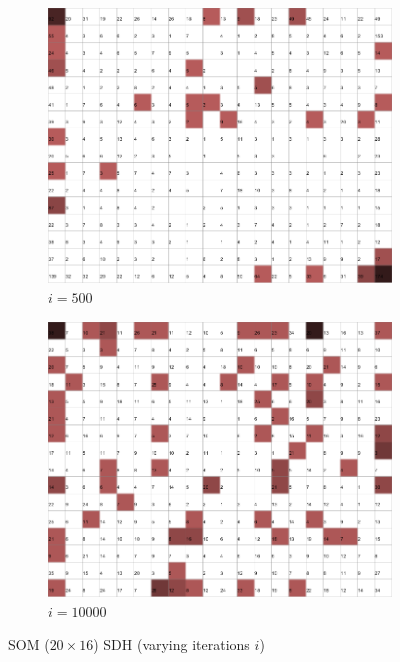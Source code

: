 \documentclass{acm_proc_article-sp}
\begin{document}
\begin{figure}
\begin{subfigure}[b]{0.24\linewidth}
    \end{subfigure}
    \begin{subfigure}[b]{0.24\linewidth}
        \includegraphics[width=\linewidth]{img/wine-newmid-topographic-error-i-500}
        \caption{$i=500$}
        \label{fig:wine-newmid-topographic-error-i-500}
    \end{subfigure}
    \begin{subfigure}[b]{0.24\linewidth}
        \includegraphics[width=\linewidth]{img/wine-newmid-topographic-error-i-10000}
        \caption{$i=10000$}
        \label{fig:wine-newmid-topographic-error-i-10000}
    \end{subfigure}
    \caption{SOM ($20\times16$) SDH (varying iterations $i$)}
    \label{fig:wine-newmid-topographic-error-i}
\end{figure}
\end{document}
